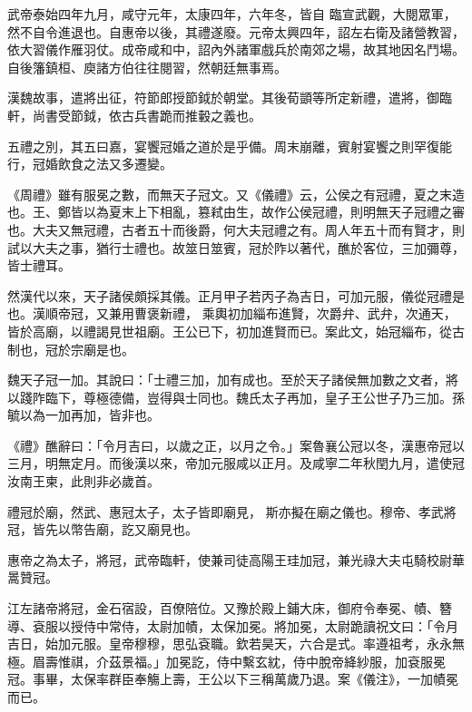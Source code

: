 \begin{pinyinscope}
 武帝泰始四年九月，咸守元年，太康四年，六年冬，皆自
 臨宣武觀，大閱眾軍，然不自令進退也。自惠帝以後，其禮遂廢。元帝太興四年，詔左右衛及諸營教習，依大習儀作雁羽仗。成帝咸和中，詔內外諸軍戲兵於南郊之場，故其地因名鬥場。自後籓鎮桓、庾諸方伯往往閱習，然朝廷無事焉。



 漢魏故事，遣將出征，符節郎授節鉞於朝堂。其後荀顗等所定新禮，遣將，御臨軒，尚書受節鉞，依古兵書跪而推轂之義也。



 五禮之別，其五曰嘉，宴饗冠婚之道於是乎備。周末崩離，賓射宴饗之則罕復能行，冠婚飲食之法又多遷變。



 《周禮》雖有服冕之數，而無天子冠文。又《儀禮》云，公侯之有冠禮，夏之末造也。王、鄭皆以為夏末上下相亂，篡弒由生，故作公侯冠禮，則明無天子冠禮之審也。大夫又無冠禮，古者五十而後爵，何大夫冠禮之有。周人年五十而有賢才，則試以大夫之事，猶行士禮也。故筮日筮賓，冠於阼以著代，醮於客位，三加彌尊，皆士禮耳。



 然漢代以來，天子諸侯頗採其儀。正月甲子若丙子為吉日，可加元服，儀從冠禮是也。漢順帝冠，又兼用曹褒新禮，
 乘輿初加緇布進賢，次爵弁、武弁，次通天，皆於高廟，以禮謁見世祖廟。王公已下，初加進賢而已。案此文，始冠緇布，從古制也，冠於宗廟是也。



 魏天子冠一加。其說曰：「士禮三加，加有成也。至於天子諸侯無加數之文者，將以踐阼臨下，尊極德備，豈得與士同也。魏氏太子再加，皇子王公世子乃三加。孫毓以為一加再加，皆非也。



 《禮》醮辭曰：「令月吉曰，以歲之正，以月之令。」案魯襄公冠以冬，漢惠帝冠以三月，明無定月。而後漢以來，帝加元服咸以正月。及咸寧二年秋閏九月，遣使冠汝南王柬，此則非必歲首。



 禮冠於廟，然武、惠冠太子，太子皆即廟見，
 斯亦擬在廟之儀也。穆帝、孝武將冠，皆先以幣告廟，訖又廟見也。



 惠帝之為太子，將冠，武帝臨軒，使兼司徒高陽王珪加冠，兼光祿大夫屯騎校尉華暠贊冠。



 江左諸帝將冠，金石宿設，百僚陪位。又豫於殿上鋪大床，御府令奉冕、幘、簪導、袞服以授侍中常侍，太尉加幘，太保加冕。將加冕，太尉跪讀祝文曰：「令月吉日，始加元服。皇帝穆穆，思弘袞職。欽若昊天，六合是式。率遵祖考，永永無極。眉壽惟祺，介茲景福。」加冕訖，侍中繫玄紞，侍中脫帝絳紗服，加袞服冕冠。事畢，太保率群臣奉觴上壽，王公以下三稱萬歲乃退。案《儀注》，一加幘冕而已。




\end{pinyinscope}
